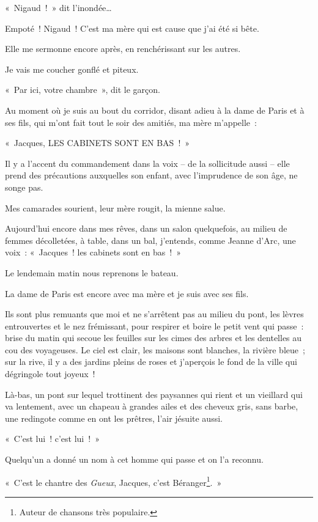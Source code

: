 \documentclass[french,twoside]{book} %
\begin{document}
« Nigaud ! » dit l’inondée…\par
Empoté ! Nigaud ! C’est ma mère qui est cause que j’ai été si bête.\par
Elle me sermonne encore après, en renchérissant sur les autres.\par
Je vais me coucher gonflé et piteux.\par
« Par ici, votre chambre », dit le garçon.\par
Au moment où je suis au bout du corridor, disant adieu à la dame de Paris et à ses fils, qui m’ont fait tout le soir des amitiés, ma mère m’appelle :\par
« Jacques, LES CABINETS SONT EN BAS ! »\par
\bigbreak
\noindent Il y a l’accent du commandement dans la voix – de la sollicitude aussi – elle prend des précautions auxquelles son enfant, avec l’imprudence de son âge, ne songe pas.\par
Mes camarades sourient, leur mère rougit, la mienne salue.\par
Aujourd’hui encore dans mes rêves, dans un salon quelquefois, au milieu de femmes décolletées, à table, dans un bal, j’entends, comme Jeanne d’Arc, une voix : « Jacques ! les cabinets sont en bas ! »\par
\bigbreak
\noindent Le lendemain matin nous reprenons le bateau.\par
La dame de Paris est encore avec ma mère et je suis avec ses fils.\par
Ils sont plus remuants que moi et ne s’arrêtent pas au milieu du pont, les lèvres entrouvertes et le nez frémissant, pour respirer et boire le petit vent qui passe : brise du matin qui secoue les feuilles sur les cimes des arbres et les dentelles au cou des voyageuses. Le ciel est clair, les maisons sont blanches, la rivière bleue ; sur la rive, il y a des jardins pleins de roses et j’aperçois le fond de la ville qui dégringole tout joyeux !\par
\bigbreak
\noindent Là-bas, un pont sur lequel trottinent des paysannes qui rient et un vieillard qui va lentement, avec un chapeau à grandes ailes et des cheveux gris, sans barbe, une redingote comme en ont les prêtres, l’air jésuite aussi.\par
« C’est lui ! c’est lui ! »\par
Quelqu’un a donné un nom à cet homme qui passe et on l’a reconnu.\par
« C’est le chantre des\emph{ Gueux}, Jacques, c’est Béranger\footnote{Auteur de chansons très populaire.}. »\par
\end{document}
